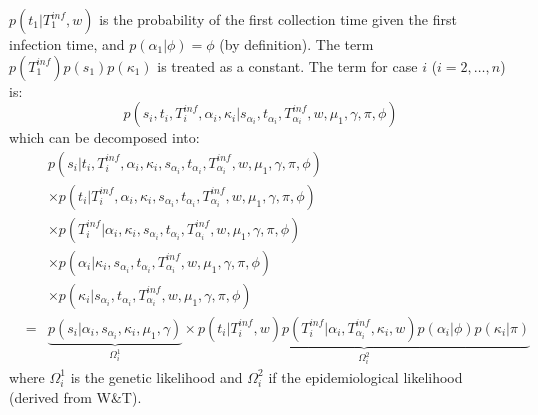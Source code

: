 \documentclass[10pt]{article}
\begin{document}
$p(t_1 | T_1^{inf},w)$ is the probability of the first collection time given the first infection time, and $p(\alpha_1 | \phi)=\phi$ (by definition).
The term $p(T_1^{inf}) p(s_1) p(\kappa_1)$ is treated as a constant.
The term for case $i$ ($i=2,\ldots,n$) is:
\begin{equation}
 p(s_i, t_i, T_i^{inf}, \alpha_i, \kappa_i| s_{\alpha_i}, t_{\alpha_i}, T_{\alpha_i}^{inf},  w, \mu_1, \gamma, \pi, \phi)
\end{equation}
which can be decomposed into:
\begin{eqnarray}
& & p(s_i | t_i, T_i^{inf}, \alpha_i, \kappa_i, s_{\alpha_i}, t_{\alpha_i}, T_{\alpha_i}^{inf},  w, \mu_1, \gamma, \pi, \phi) \nonumber \\
& &  \times  p(t_i | T_i^{inf}, \alpha_i, \kappa_i, s_{\alpha_i}, t_{\alpha_i}, T_{\alpha_i}^{inf},  w, \mu_1, \gamma, \pi, \phi) \nonumber \\
& & \times  p(T_i^{inf}| \alpha_i, \kappa_i, s_{\alpha_i}, t_{\alpha_i}, T_{\alpha_i}^{inf},  w, \mu_1, \gamma, \pi, \phi) \nonumber \\
& & \times  p(\alpha_i | \kappa_i, s_{\alpha_i}, t_{\alpha_i}, T_{\alpha_i}^{inf},  w, \mu_1, \gamma, \pi, \phi) \nonumber \\
& & \times  p(\kappa_i | s_{\alpha_i}, t_{\alpha_i}, T_{\alpha_i}^{inf},  w, \mu_1, \gamma, \pi, \phi) \nonumber \\
& = & 
\underbrace{p(s_i | \alpha_i, s_{\alpha_i}, \kappa_i, \mu_1, \gamma)}_{\Omega_i^1} 
  \times  \underbrace{p(t_i | T_i^{inf}, w) 
  p(T_i^{inf}| \alpha_i, T_{\alpha_i}^{inf}, \kappa_i, w) p(\alpha_i | \phi) p(\kappa_i | \pi)}_{\Omega_i^2}
\end{eqnarray}
\noindent where $\Omega_i^1$ is the genetic likelihood and $\Omega_i^2$ if the epidemiological likelihood (derived from W\&T).
\\
\end{document}
